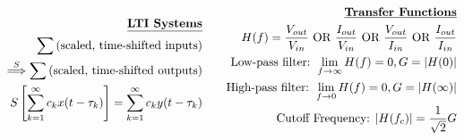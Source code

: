\documentclass[11pt]{article}
\begin{document}
\begin{eqnarray*}
\begin{split}
\mbox{{\bf \underline{LTI Systems}}}\\
\sum \mbox{(scaled, time-shifted inputs)}\\
\overset{S}{\Longrightarrow} \sum \mbox{(scaled, time-shifted outputs)}\\
S \left[ \sum_{k=1}^\infty c_k x(t-\tau_k) \right] = \sum_{k=1}^\infty c_k y(t-\tau_k)
\end{split}
\qquad
\begin{split}
\mbox{{\bf \underline{Transfer Functions}}}\\
H(f) = \frac{V_{out}}{V_{in}} \mbox{ OR } \frac{I_{out}}{V_{in}} \mbox{ OR }  \frac{V_{out}}{I_{in}} \mbox{ OR }  \frac{I_{out}}{I_{in}}\\
\mbox{Low-pass filter: }  \lim_{f\rightarrow \infty} H(f) = 0, G = \vert H(0) \vert\\
\mbox{High-pass filter: }  \lim_{f\rightarrow 0} H(f) = 0, G = \vert H(\infty) \vert\\
\mbox{Cutoff Frequency: } \vert H(f_c) \vert = \frac{1}{\sqrt{2}} G
\end{split}
\end{eqnarray*}
\end{document}
